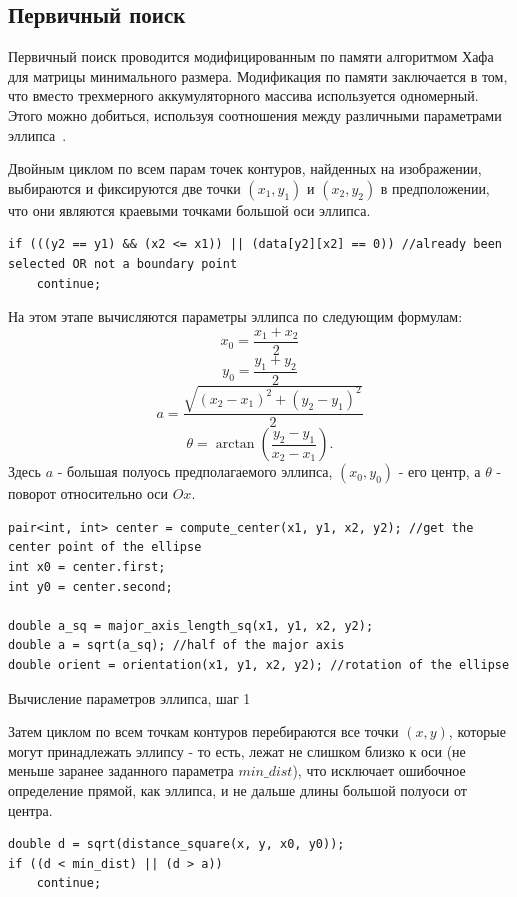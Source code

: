 \subsection{Первичный поиск}
Первичный поиск проводится модифицированным по памяти алгоритмом Хафа для матрицы минимального размера.
Модификация по памяти заключается в том, что вместо трехмерного аккумуляторного массива используется одномерный.
Этого можно добиться, используя соотношения между различными параметрами эллипса~\autocite{OneDim}.

Двойным циклом по всем парам точек контуров, найденных на изображении, выбираются и фиксируются две точки \((x_1, y_1)\) и \((x_2, y_2)\) в предположении, что они являются краевыми точками большой оси эллипса.

\begin{lstlisting}
if (((y2 == y1) && (x2 <= x1)) || (data[y2][x2] == 0)) //already been selected OR not a boundary point
    continue;
\end{lstlisting}

На этом этапе вычисляются параметры эллипса по следующим формулам:
$$x_0 = \frac{x_1 + x_2}{2}$$
$$y_0 = \frac{y_1 + y_2}{2}$$
$$a = \frac{\sqrt{(x_2 - x_1)^2 + (y_2 - y_1)^2}}{2}$$
$$\theta = \arctan(\frac{y_2 - y_1}{x_2 - x_1}).$$
Здесь \(a\) - большая полуось предполагаемого эллипса, \((x_0, y_0)\) - его центр, а \(\theta\) - поворот относительно оси \(Ox\).

\begin{ListingEnv}[H]
\begin{lstlisting}
pair<int, int> center = compute_center(x1, y1, x2, y2); //get the center point of the ellipse
int x0 = center.first;
int y0 = center.second;

double a_sq = major_axis_length_sq(x1, y1, x2, y2);
double a = sqrt(a_sq); //half of the major axis
double orient = orientation(x1, y1, x2, y2); //rotation of the ellipse
\end{lstlisting}
\caption{Вычисление параметров эллипса, шаг 1}
\label{list:majoraxis}
\end{ListingEnv}

Затем циклом по всем точкам контуров перебираются все точки \((x,y)\), которые могут принадлежать эллипсу - то есть, лежат не слишком близко к оси (не меньше заранее заданного параметра \(min\_dist\)), 
что исключает ошибочное определение прямой, как эллипса, и не дальше длины большой полуоси от центра.

\begin{lstlisting}
double d = sqrt(distance_square(x, y, x0, y0));
if ((d < min_dist) || (d > a))
    continue;
\end{lstlisting}

